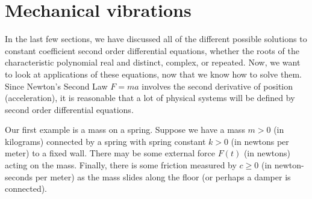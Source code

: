 \section{Mechanical vibrations} \label{sec:mv}




In the last few sections, we have discussed all of the different possible solutions to constant coefficient second order differential equations, whether the roots of the characteristic polynomial real and distinct, complex, or repeated. Now, we want to look at applications of these equations, now that we know how to solve them. Since Newton's Second Law $F = ma$ involves the second derivative of position (acceleration), it is reasonable that a lot of physical systems will be defined by second order differential equations.

\begin{mywrapfigsimp}{2.0in}{2.3in}
\noindent
{}
\end{mywrapfigsimp}
Our first example is a mass on a spring.  Suppose we have a mass $m > 0$
(in kilograms) connected
by a spring with spring constant $k > 0$ (in newtons per meter)
to a fixed wall.  There may be some external
force $F(t)$ (in newtons) acting on the mass.  Finally, there is some
friction measured by $c \geq 0$ (in newton-seconds per meter) as the mass
slides along the floor (or perhaps a damper is connected).

